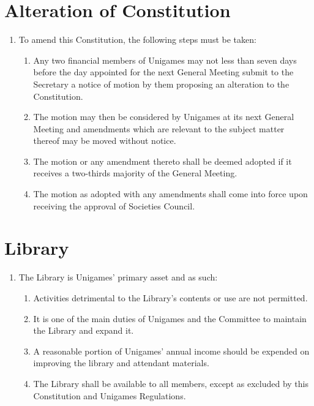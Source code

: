 \documentclass[a4paper]{article}
\begin{document}
\section{Alteration of Constitution} \label{sec:alteration}
\begin{enumerate}
    \item To amend this Constitution, the following steps must be taken:
          \begin{enumerate}
              \item Any two financial members of Unigames may not less than seven days before the day appointed for the next General Meeting submit to the Secretary a notice of motion by them proposing an alteration to the Constitution.
              \item The motion may then be considered by Unigames at its next General Meeting and amendments which are relevant to the subject matter thereof may be moved without notice.
              \item The motion or any amendment thereto shall be deemed adopted if it receives a two-thirds majority of the General Meeting.
              \item The motion as adopted with any amendments shall come into force upon receiving the approval of Societies Council.
          \end{enumerate}
\end{enumerate}


\section{Library} \label{sec:library}
\begin{enumerate}
    \item The Library is Unigames' primary asset and as such:
          \begin{enumerate}
              \item Activities detrimental to the Library's contents or use are not permitted.
              \item It is one of the main duties of Unigames and the Committee to maintain the Library and expand it.
              \item A reasonable portion of Unigames' annual income should be expended on improving the library and attendant materials.
              \item The Library shall be available to all members, except as excluded by this Constitution and Unigames Regulations.
          \end{enumerate}
\end{enumerate}
\end{document}
